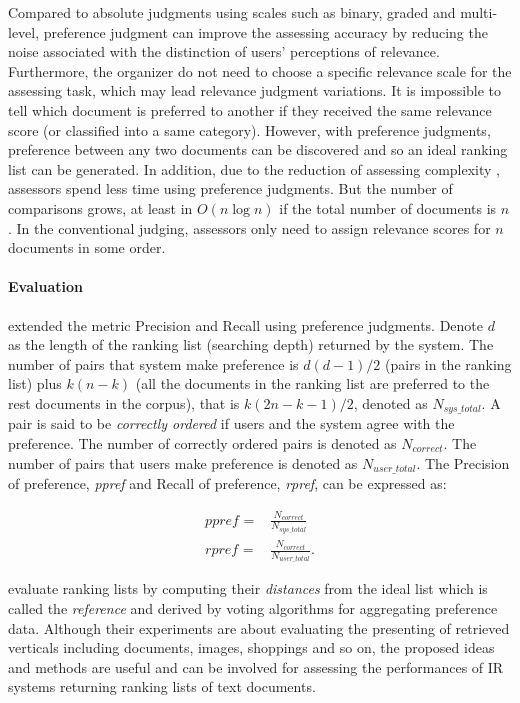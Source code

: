 \documentclass{article}
\begin{document}
Compared to absolute judgments using scales such as binary, graded and multi-level, preference judgment can improve the assessing accuracy by reducing the noise associated with the distinction of users' perceptions of relevance. Furthermore, the organizer do not need to choose a specific relevance scale for the assessing task, which may lead relevance judgment variations. It is impossible to tell which document is preferred to another if they received the same relevance score (or classified into a same category). However, with preference judgments, preference between any two documents can be discovered and so an ideal ranking list can be generated. In addition, due to the reduction of assessing complexity , assessors spend less time using preference judgments. But the number of comparisons grows, at least in $O(n\log n)$ if the total number of documents is $n$. In the conventional judging, assessors only need to assign relevance scores for $n$ documents in some order.

\paragraph{Evaluation}

\citet{eval.measure.pref.judge} extended the metric Precision and Recall using preference judgments. Denote $d$ as the length of the ranking list (searching depth) returned by the system. The number of pairs that system make preference is $d(d-1)/2$ (pairs in the ranking list) plus $k(n-k)$ (all the documents in the ranking list are preferred to the rest documents in the corpus), that is $k(2n-k-1)/2$, denoted as $N_{\textit{sys\_total}}$. A pair is said to be \textit{correctly ordered} if users and the system agree with the preference. The number of correctly ordered pairs is denoted as $N_{\textit{correct}}$. The number of pairs that users make preference is denoted as $N_{\textit{user\_total}}$. The Precision of preference, \textit{ppref} and Recall of preference, \textit{rpref}, can be expressed as:

\begin{align*}
 \textit{ppref = } & \frac{N_{\textit{correct}}}{N_{\textit{sys\_total}}}\\[1.2em]
 \textit{rpref = } & \frac{N_\textit{correct}}{N_{\textit{user\_total}}}.
\end{align*}

\citet{eval.aggregated.search} evaluate ranking lists by computing their \textit{distances} from the ideal list which is called the \textit{reference} and derived by voting algorithms for aggregating preference data. Although their experiments are about evaluating the presenting of retrieved verticals including documents, images, shoppings and so on, the proposed ideas and methods are useful and can be involved for assessing the performances of IR systems returning ranking lists of text documents.
\end{document}
